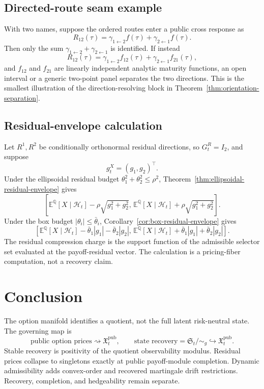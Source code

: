 \documentclass[11pt,a4paper]{amsart}
\theoremstyle{plain}
\theoremstyle{definition}
\theoremstyle{remark}
\newcommand{\QQ}{\mathbb{Q}}
\newcommand{\EE}{\mathbb{E}}
\newcommand{\cH}{\mathcal{H}}
\begin{document}
\subsection{Directed-route seam example}

With two names, suppose the ordered routes enter a public cross response as
\[
        R_{12}(\tau)
        =
        \gamma_{1\leftarrow2}f(\tau)
        +
        \gamma_{2\leftarrow1}f(\tau).
\]
Then only the sum \(\gamma_{1\leftarrow2}+\gamma_{2\leftarrow1}\) is identified.  If instead
\[
        R_{12}(\tau)
        =
        \gamma_{1\leftarrow2}f_{12}(\tau)
        +
        \gamma_{2\leftarrow1}f_{21}(\tau),
\]
and \(f_{12}\) and \(f_{21}\) are linearly independent analytic maturity functions, an open
interval or a generic two-point panel separates the two directions.  This is the smallest
illustration of the direction-resolving block in
Theorem~\ref{thm:orientation-separation}.

\subsection{Residual-envelope calculation}

Let \(R^1,R^2\) be conditionally orthonormal residual directions, so \(G_t^R=I_2\), and suppose
\[
        g_t^X=(g_1,g_2)^\top .
\]
Under the ellipsoidal residual budget \(\theta_1^2+\theta_2^2\le\rho^2\),
Theorem~\ref{thm:ellipsoidal-residual-envelope} gives
\[
        \left[
        \EE^\QQ[X\mid\cH_t]-\rho\sqrt{g_1^2+g_2^2},\,
        \EE^\QQ[X\mid\cH_t]+\rho\sqrt{g_1^2+g_2^2}
        \right].
\]
Under the box budget \(|\theta_i|\le\bar\theta_i\), Corollary~\ref{cor:box-residual-envelope}
gives
\[
        \left[
        \EE^\QQ[X\mid\cH_t]-\bar\theta_1|g_1|-\bar\theta_2|g_2|,\,
        \EE^\QQ[X\mid\cH_t]+\bar\theta_1|g_1|+\bar\theta_2|g_2|
        \right].
\]
The residual compression charge is the support function of the admissible selector set evaluated
at the payoff-residual vector.  The calculation is a pricing-fiber computation, not a recovery
claim.

\section{Conclusion}\label{sec:conclusion}

The option manifold identifies a quotient, not the full latent risk-neutral state.  The governing
map is
\[
        \text{public option prices}\rightsquigarrow\mathfrak X_t^{\mathrm{pub}},
        \qquad
        \text{state recovery}=\mathfrak S_t/\!\sim_g\hookrightarrow
        \mathfrak X_t^{\mathrm{pub}} .
\]
Stable recovery is positivity of the quotient observability modulus.  Residual prices collapse to
singletons exactly at public payoff-module completion.  Dynamic admissibility adds convex-order
and recovered martingale drift restrictions.  Recovery, completion, and hedgeability remain separate.
\end{document}
